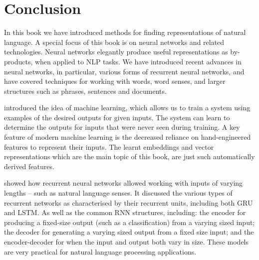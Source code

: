 \documentclass[12pt,parskip]{komatufte}
\begin{document}

\chapter{Conclusion}\label{sec:conclusion}

In this book we have introduced methods for finding representations of natural language.
A special  focus of this book is on neural networks and related technologies.
Neural networks elegantly produce useful representations as by-products, when applied to  NLP tasks.
We have introduced recent advances in neural networks, in particular, various forms of recurrent neural networks,
and have covered techniques for working with words, word senses, and larger structures such as phrases, sentences and documents.





 introduced the idea of machine learning,
which allows us to train a system using examples of the desired outputs for given inputs.
The system can learn to determine the outputs for inputs that were never seen during training.
A key feature of modern machine learning is the decreased reliance on hand-engineered features to represent their inputs.
The learnt embeddings and vector representations which are the main topic of this book, are just such automatically derived features.


 showed how recurrent neural networks allowed working with inputs of varying lengths -- such as natural language senses.
It discussed the various types of recurrent networks as characterised by their recurrent units, including both GRU and LSTM.
As well as the common RNN structures, including:
the encoder for producing a fixed-size  output (such as a classification) from a varying sized input;
the decoder for generating a varying sized output from a fixed size input;
and the encoder-decoder for when the input and output both vary in size.
These models are very practical for natural language processing applications.
\end{document}
